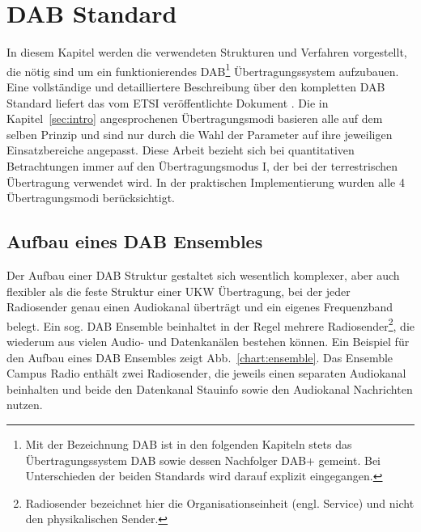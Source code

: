 \chapter{DAB Standard}
\label{sec:standard}
In diesem Kapitel werden die verwendeten Strukturen und Verfahren vorgestellt, die nötig sind um ein funktionierendes DAB\footnote{Mit der Bezeichnung DAB ist in den folgenden Kapiteln stets das Übertragungssystem DAB sowie dessen Nachfolger DAB+ gemeint. Bei Unterschieden der beiden Standards wird darauf explizit eingegangen.} Übertragungssystem aufzubauen. Eine vollständige und detailliertere Beschreibung über den kompletten DAB Standard liefert das vom \ac{ETSI} veröffentlichte Dokument \cite{etsi:dab_main}. Die in Kapitel~\ref{sec:intro} angesprochenen Übertragungsmodi basieren alle auf dem selben Prinzip und sind nur durch die Wahl der Parameter auf ihre jeweiligen Einsatzbereiche angepasst. Diese Arbeit bezieht sich bei quantitativen Betrachtungen immer auf den Übertragungsmodus I, der bei der terrestrischen Übertragung verwendet wird. In der praktischen Implementierung wurden alle 4 Übertragungsmodi berücksichtigt.

\section{Aufbau eines DAB Ensembles}
Der Aufbau einer DAB Struktur gestaltet sich wesentlich komplexer, aber auch flexibler als die feste Struktur einer UKW Übertragung, bei der jeder Radiosender genau einen Audiokanal überträgt und ein eigenes Frequenzband belegt. Ein sog. DAB Ensemble beinhaltet in der Regel mehrere Radiosender\footnote{\glqq Radiosender\grqq{} bezeichnet hier die Organisationseinheit (engl. \glqq Service\grqq{}) und nicht den physikalischen Sender.}, die wiederum aus vielen Audio- und Datenkanälen bestehen können. Ein Beispiel für den Aufbau eines DAB Ensembles zeigt Abb.~\ref{chart:ensemble}. Das Ensemble \glqq Campus Radio\grqq{} enthält zwei Radiosender, die jeweils einen separaten Audiokanal beinhalten und beide den Datenkanal \glqq Stauinfo\grqq{} sowie den Audiokanal \glqq Nachrichten\grqq{} nutzen.\\

